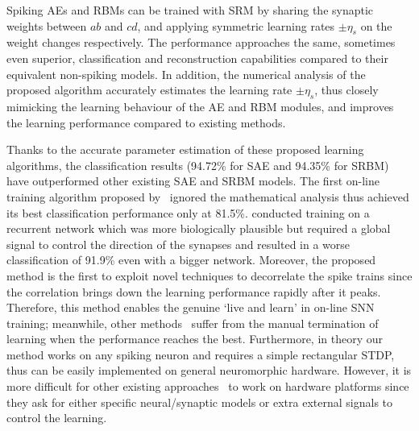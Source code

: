 Spiking AEs and RBMs can be trained with SRM by sharing the synaptic weights between $ab$ and $cd$, and applying symmetric learning rates $\pm \eta_s$ on the weight changes respectively.
The performance approaches the same, sometimes even superior, classification and reconstruction capabilities compared to their equivalent non-spiking models.
In addition, the numerical analysis of the proposed algorithm accurately estimates the learning rate $\pm \eta_s$, thus closely mimicking the learning behaviour of the AE and RBM modules, and improves the learning performance compared to existing methods.






Thanks to the accurate parameter estimation of these proposed learning algorithms, the classification results (94.72\% for SAE and 94.35\% for SRBM) have outperformed other existing SAE and SRBM models.
The first on-line training algorithm proposed by~\citet{neil2013online} ignored the mathematical analysis thus achieved its best classification performance only at 81.5\%.
\citet{neftci2013event} conducted training on a recurrent network which was more biologically plausible but required a global signal to control the direction of the synapses and resulted in a worse classification of 91.9\% even with a bigger network.
Moreover, the proposed method is the first to exploit novel techniques to decorrelate the spike trains since the correlation brings down the learning performance rapidly after it peaks.
Therefore, this method enables the genuine `live and learn' in on-line SNN training;
meanwhile, other methods~\citep{neftci2016stochastic,neftci2017event} suffer from the manual termination of learning when the performance reaches the best.
Furthermore, in theory our method works on any spiking neuron and requires a simple rectangular STDP, thus can be easily implemented on general neuromorphic hardware.
However, it is more difficult for other existing approaches~\citep{neftci2013event,neftci2016stochastic,neftci2017event} to work on hardware platforms since they ask for either specific neural/synaptic models or extra external signals to control the learning.

